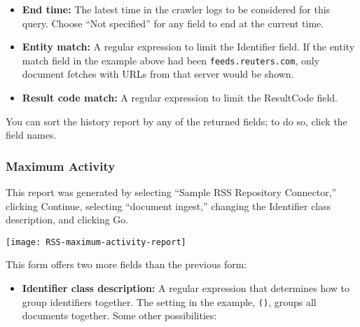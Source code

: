 \begin{changemargin}{1.5in}{0in}
\begin{itemize}
\item \textbf{End time:} The latest time in the crawler logs to be
considered for this query. Choose ``Not specified'' for any field 
to end at the current time.

\item \textbf{Entity match:} A regular expression to limit the
Identifier field. If the entity match field in the example above had
been \texttt{feeds.reuters.com}, only document fetches with
URLs from that server would be shown.

\item \textbf{Result code match:} A regular expression to limit the
ResultCode field.

\end{itemize}

You can sort the history report by any of the returned fields; to do so,
click the field names.


\subsubsection{Maximum Activity}

This report was generated by selecting ``Sample RSS Repository Connector,''
clicking Continue, selecting ``document ingest,'' changing the Identifier
class description, and clicking Go.

\texttt{[image: RSS-maximum-activity-report]}

This form offers two more fields than the previous form:

\begin{itemize}

\item \textbf{Identifier class description:} A regular expression that
determines how to group identifiers together. The setting in the example,
\texttt{()}, groups all documents together. Some other possibilities:

\begin{itemize}


\end{itemize}
\end{itemize}
\end{changemargin}
